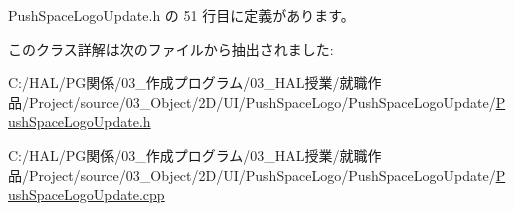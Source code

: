  Push\+Space\+Logo\+Update.\+h の 51 行目に定義があります。



このクラス詳解は次のファイルから抽出されました\+:\begin{DoxyCompactItemize}
\item 
C\+:/\+H\+A\+L/\+P\+G関係/03\+\_\+作成プログラム/03\+\_\+\+H\+A\+L授業/就職作品/\+Project/source/03\+\_\+\+Object/2\+D/\+U\+I/\+Push\+Space\+Logo/\+Push\+Space\+Logo\+Update/\mbox{\hyperlink{_push_space_logo_update_8h}{Push\+Space\+Logo\+Update.\+h}}\item 
C\+:/\+H\+A\+L/\+P\+G関係/03\+\_\+作成プログラム/03\+\_\+\+H\+A\+L授業/就職作品/\+Project/source/03\+\_\+\+Object/2\+D/\+U\+I/\+Push\+Space\+Logo/\+Push\+Space\+Logo\+Update/\mbox{\hyperlink{_push_space_logo_update_8cpp}{Push\+Space\+Logo\+Update.\+cpp}}\end{DoxyCompactItemize}

